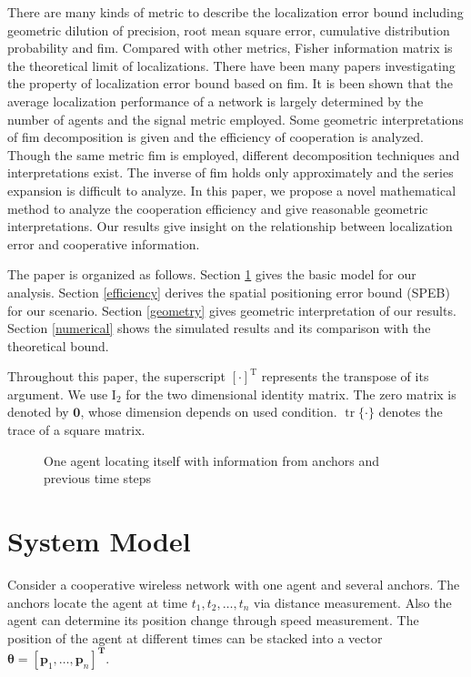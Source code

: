 \documentclass[conference]{IEEEtran}
\DeclareMathOperator\tr{tr}
\begin{document}
There are many kinds of metric to describe the localization error bound 
including geometric dilution of precision\cite{6237577}, root mean square error, 
cumulative distribution probability and \ac{fim}. 
Compared with other metrics, Fisher information matrix is the theoretical limit of localizations\cite{LimitBound2}. 
There have been many papers investigating the property of localization error bound based on \ac{fim}. 
It is been shown that the average localization performance of a network is largely determined by the number of agents and the signal metric employed\cite{7887727}. 
Some geometric interpretations of \ac{fim} decomposition is given and the efficiency of cooperation is analyzed\cite{7962761}. 
Though the same metric \ac{fim} is employed, different decomposition techniques and interpretations exist. 
The inverse of \ac{fim} holds only approximately\cite{7887727} 
and the series expansion is difficult  to analyze\cite{7962761}. In this paper, 
we propose a novel mathematical method to analyze the cooperation efficiency and give reasonable geometric interpretations. 
Our results give insight on the relationship between localization error and cooperative information. 

The paper is organized as follows. Section \ref{systemModel} gives the basic model for our analysis. 
Section \ref{efficiency} derives the spatial positioning error bound (SPEB) for our scenario. 
Section \ref{geometry} gives geometric interpretation of our results. 
Section \ref{numerical} shows the simulated results and its comparison with the theoretical bound.

Throughout this paper, the superscript $[\cdot]^{\mathrm{T}}$ represents the transpose of its argument. 
We use $\bm{\mathrm{I}}_2$ for the two dimensional identity matrix. The zero matrix is denoted by $\bm{0}$, 
whose dimension depends on used condition. $\tr\{\cdot\}$ 
denotes the trace of a square matrix.
\begin{figure}
  \centering
\def\svgwidth{7cm}

\caption{One agent locating itself with information from anchors and previous time steps}
\label{f1}
\end{figure}
\section{System Model}\label{systemModel}
Consider a cooperative wireless network with one agent and several anchors. The anchors locate the agent at time $t_1,t_2,\dots,t_n$ via distance measurement. Also the agent can determine its position change through speed measurement. The position of the agent at different times can be stacked into a vector $\bm{\theta}=[\bm{p}_1,\dots,\bm{p}_n]^{\mathbf{T}}$.
\end{document}
